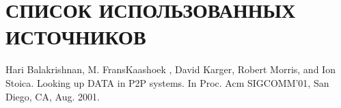 \section*{СПИСОК ИСПОЛЬЗОВАННЫХ ИСТОЧНИКОВ}

\begin{thebibliography}{9}
	 Hari Balakrishnan, M. FransKaashoek , David Karger, Robert Morris, and Ion Stoica. Looking up DATA in P2P systems. In Proc. Acm SIGCOMM’01, San Diego, CA, Aug. 2001.
	
\end{thebibliography}